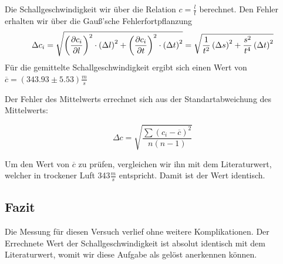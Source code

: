 Die Schallgeschwindigkeit wir über die Relation \(c=\frac{l}{t}\) berechnet. Den Fehler erhalten wir über die Gauß'sche Fehlerfortpflanzung
\begin{equation}
\notag
\Delta c_i = \sqrt{\left(\frac{\partial c_i}{\partial l}\right)^2\cdot \left(\Delta l\right)^2+\left(\frac{\partial c_i}{\partial t}\right)^2\cdot \left(\Delta t\right)^2}=\sqrt{\frac{1}{t^2}\left(\Delta s\right)^2+\frac{s^2}{t^4}\left(\Delta t\right)^2}
\end{equation}
Für die gemittelte Schallgeschwindigkeit ergibt sich einen Wert von\\
\(\overline{c}=(343.93 \pm 5.53)\frac{m}{s}\)

Der Fehler des Mittelwerts errechnet sich aus der Standartabweichung des Mittelwerts:

\begin{equation}
\Delta c=\sqrt{\frac{\sum (c_i-\overline{c})^2}{n(n-1)}}
\end{equation}

Um den Wert von \(\overline{c}\) zu prüfen, vergleichen wir ihn mit dem Literaturwert, welcher in trockener Luft 343\(\frac{m}{s}\) entspricht. Damit ist der Wert identisch.

\subsection{Fazit}
Die Messung für diesen Versuch verlief ohne weitere Komplikationen. Der Errechnete Wert der Schallgeschwindigkeit ist absolut identisch mit dem Literaturwert, womit wir diese Aufgabe als gelöst anerkennen können.

